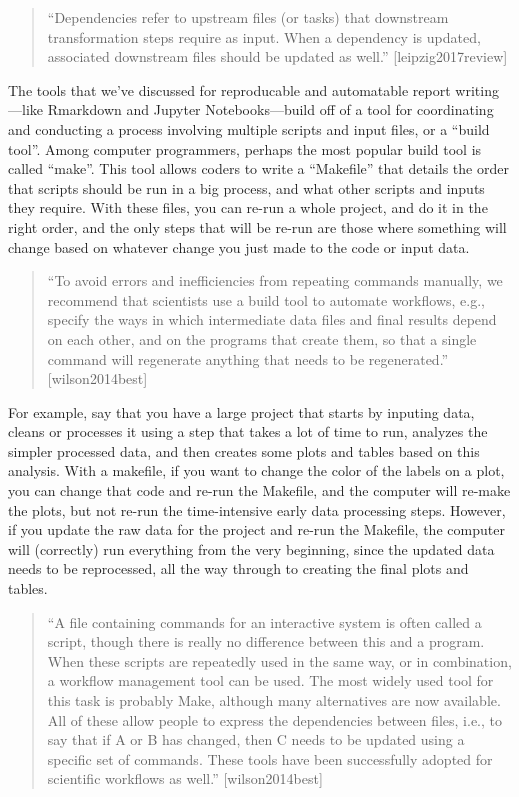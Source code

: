 \documentclass[]{tufte-book}
\begin{document}
\begin{quote}
``Dependencies refer to upstream files (or tasks) that downstream transformation
steps require as input. When a dependency is updated, associated downstream files
should be updated as well.'' {[}leipzig2017review{]}
\end{quote}

The tools that we've discussed for reproducable and automatable report writing---like
Rmarkdown and Jupyter Notebooks---build off of a tool for coordinating and
conducting a process involving multiple scripts and input files, or a ``build tool''.
Among computer programmers, perhaps the most popular build tool is called ``make''.
This tool allows coders to write a ``Makefile'' that details the order that scripts
should be run in a big process, and what other scripts and inputs they require.
With these files, you can re-run a whole project, and do it in the right order,
and the only steps that will be re-run are those where something will change based
on whatever change you just made to the code or input data.

\begin{quote}
``To avoid errors and inefficiencies from repeating commands manually, we recommend
that scientists use a build tool to automate workflows, e.g., specify the ways in
which intermediate data files and final results depend on each other, and on the programs
that create them, so that a single command will regenerate anything that needs to
be regenerated.'' {[}wilson2014best{]}
\end{quote}

For example, say that you have a large project that starts by inputing data, cleans
or processes it using a step that takes a lot of time to run, analyzes the simpler
processed data, and then creates some plots and tables based on this analysis. With
a makefile, if you want to change the color of the labels on a plot, you can change that
code and re-run the Makefile, and the computer will re-make the plots, but not re-run
the time-intensive early data processing steps. However, if you update the raw data
for the project and re-run the Makefile, the computer will (correctly) run everything
from the very beginning, since the updated data needs to be reprocessed, all the way
through to creating the final plots and tables.

\begin{quote}
``A file containing commands for an interactive system is often called a script, though
there is really no difference between this and a program. When these scripts are
repeatedly used in the same way, or in combination, a workflow management tool can
be used. The most widely used tool for this task is probably Make, although many
alternatives are now available. All of these allow people to express the dependencies
between files, i.e., to say that if A or B has changed, then C needs to be updated
using a specific set of commands. These tools have been successfully adopted for
scientific workflows as well.'' {[}wilson2014best{]}
\end{quote}
\end{document}

